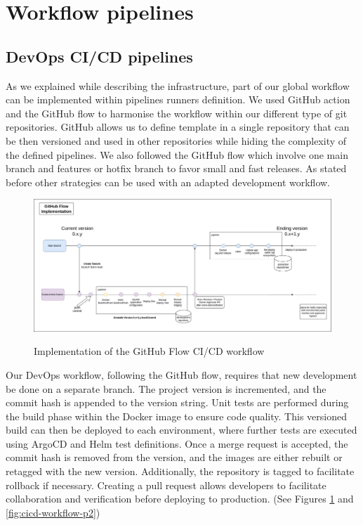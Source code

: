 \section{Workflow pipelines}\label{sec:workflow}

\subsection{DevOps CI/CD pipelines}\label{subsec:ci/cd-pipelines-and-development-workflow}
As we explained while describing the infrastructure, part of our global workflow can be implemented within pipelines runners definition.
We used GitHub action and the GitHub flow to harmonise the workflow within our different type of git repositories.
GitHub allows us to define template in a single repository that can be then versioned and used in other repositories while hiding the complexity of the defined pipelines.
We also followed the GitHub flow which involve one main branch and features or hotfix branch to favor small and fast releases.
As stated before other strategies can be used with an adapted development workflow.

\begin{figure}[!htbp]
    \centering
    \caption{Implementation of the GitHub Flow CI/CD workflow}
    \includegraphics[scale=0.3]{images/project/cicd-workflow-p1}
    \label{fig:cicd-workflow-p1}
\end{figure}

Our DevOps workflow, following the GitHub flow, requires that new development be done on a separate branch.
The project version is incremented, and the commit hash is appended to the version string.
Unit tests are performed during the build phase within the Docker image to ensure code quality.
This versioned build can then be deployed to each environment, where further tests are executed using ArgoCD and Helm test definitions.
Once a merge request is accepted, the commit hash is removed from the version, and the images are either rebuilt or retagged with the new version.
Additionally, the repository is tagged to facilitate rollback if necessary.
Creating a pull request allows developers to facilitate collaboration and verification before deploying to production.
(See Figures \ref{fig:cicd-workflow-p1} and \ref{fig:cicd-workflow-p2})

